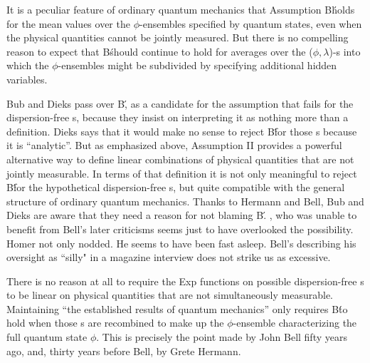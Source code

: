 It is a peculiar feature of ordinary quantum mechanics that Assumption B\'  
holds for the mean values over the $\phi$-ensembles specified by quantum states, even when the physical quantities cannot be jointly measured.    But there is no  compelling reason to expect that B\' should continue to hold for averages over the ($\phi,\lambda$)-\se s  into which the $\phi$-ensembles might be subdivided by specifying additional hidden variables.   

Bub and Dieks pass over B\',  as a candidate for the assumption that fails for the dispersion-free \se s, because they insist on interpreting it as nothing more than a definition.   Dieks says that it would make no sense to reject B\' for those %
\se s because it is ``analytic''.   But as  emphasized above,  Assumption II provides a powerful alternative way to define linear combinations of physical quantities that are not jointly measurable.    In terms of that definition it is not only meaningful  to reject B\' for the hypothetical dispersion-free \se s, but quite compatible with the general structure of ordinary quantum mechanics.
 Thanks to Hermann and Bell, Bub and Dieks are aware that they need  a reason for not blaming  B\'.   \VN, who was unable to benefit from Bell's later criticisms seems just to have overlooked the possibility.    Homer not only nodded.  He seems to have been fast asleep.   Bell's describing his oversight as ``silly" in a magazine interview does not strike us as excessive.    %

There is no reason at all to require the Exp functions on possible dispersion-free \se s to be linear on physical quantities that are not simultaneously measurable.  Maintaining ``the established results of quantum mechanics'' only requires B\' to hold when those \se s are recombined to make up the $\phi$-ensemble characterizing the full quantum state $\phi$.  This is precisely the point made by John Bell fifty years ago, and, thirty years before Bell, by Grete Hermann.


\bigskip
{}
\medskip



